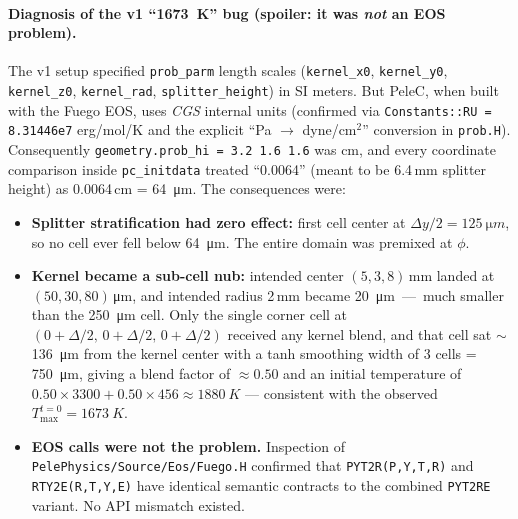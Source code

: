 \documentclass[11pt,a4paper]{article}
\begin{document}
\paragraph{Diagnosis of the v1 ``\SI{1673}{K}'' bug (spoiler: it was \emph{not} an EOS problem).}
The v1 setup specified \texttt{prob\_parm} length scales (\texttt{kernel\_x0}, \texttt{kernel\_y0},
\texttt{kernel\_z0}, \texttt{kernel\_rad}, \texttt{splitter\_height}) in SI meters. But PeleC, when
built with the Fuego EOS, uses \emph{CGS} internal units (confirmed via
\texttt{Constants::RU = 8.31446e7} erg/mol/K and the explicit ``Pa $\to$ dyne/cm$^2$'' conversion
in \texttt{prob.H}). Consequently \texttt{geometry.prob\_hi = 3.2 1.6 1.6} was cm,
and every coordinate comparison inside \texttt{pc\_initdata} treated ``0.0064'' (meant to be
6.4\,mm splitter height) as 0.0064\,cm = \SI{64}{\micro m}. The consequences were:
\begin{itemize}[leftmargin=*]
\item \textbf{Splitter stratification had zero effect:} first cell center at $\Delta y/2 = \SI{125}{\micro m}$,
     so no cell ever fell below \SI{64}{\micro m}. The entire domain was premixed at $\phi$.
\item \textbf{Kernel became a sub-cell nub:} intended center $(5, 3, 8)$\,mm landed at
     $(50, 30, 80)$\,\si{\micro m}, and intended radius 2\,mm became \SI{20}{\micro m}~---~much smaller than the
     \SI{250}{\micro m} cell. Only the single corner cell at $(0{+}\Delta/2,\,0{+}\Delta/2,\,0{+}\Delta/2)$
     received any kernel blend, and that cell sat $\sim$\SI{136}{\micro m} from the kernel center
     with a tanh smoothing width of 3 cells = \SI{750}{\micro m}, giving a blend factor of $\approx 0.50$
     and an initial temperature of $0.50\times3300 + 0.50\times456 \approx \SI{1880}{K}$ --- consistent with
     the observed $T_{\max}^{t=0} = \SI{1673}{K}$.
\item \textbf{EOS calls were not the problem.} Inspection of
     \texttt{PelePhysics/Source/Eos/Fuego.H} confirmed that \texttt{PYT2R(P,Y,T,R)} and
     \texttt{RTY2E(R,T,Y,E)} have identical semantic contracts to the combined \texttt{PYT2RE}
     variant. No API mismatch existed.
\end{itemize}
\end{document}
